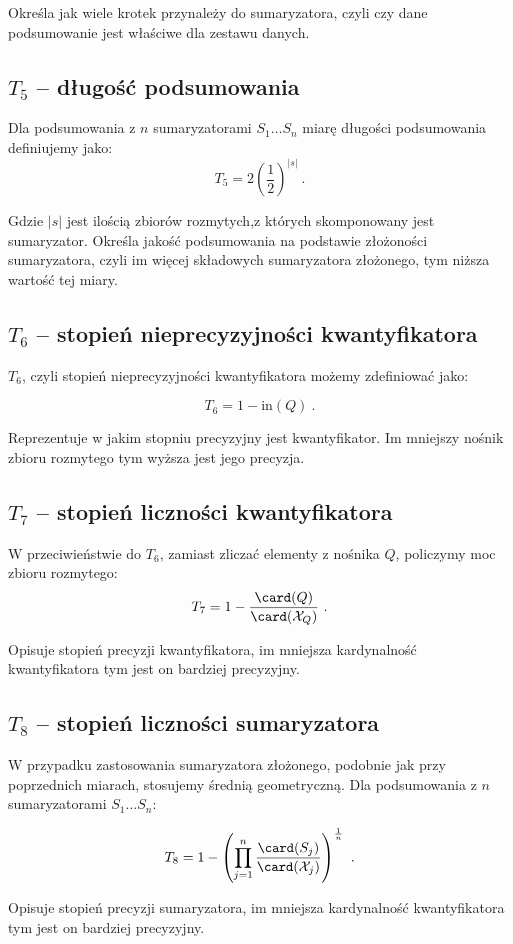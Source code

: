 \documentclass{classrep}
\begin{document}
 Określa jak wiele krotek przynależy do sumaryzatora, czyli czy dane podsumowanie jest właściwe dla zestawu danych.

\subsection{\(T_5\) -- długość podsumowania}
Dla podsumowania z \(n\) sumaryzatorami \(S_1 \ldots S_n\)
miarę długości podsumowania definiujemy jako:
\[T_5 =  2 \left(\frac{1}{2}\right)^{|s|} ~\mbox{.}\]

Gdzie \(|s|\) jest ilością zbiorów rozmytych,z  których skomponowany jest sumaryzator. Określa jakość podsumowania na podstawie złożoności sumaryzatora, czyli im więcej składowych sumaryzatora złożonego, tym niższa wartość tej miary.

\subsection{\(T_6\) -- stopień nieprecyzyjności kwantyfikatora}
\(T_6\), czyli stopień nieprecyzyjności kwantyfikatora możemy zdefiniować jako:

\[T_6 = 1-\mathrm{in}(Q) ~\mbox{.}\]

Reprezentuje w jakim stopniu precyzyjny jest kwantyfikator. Im mniejszy nośnik zbioru rozmytego tym wyższa jest jego precyzja.

\subsection{\(T_7\) -- stopień liczności kwantyfikatora}
W przeciwieństwie do \(T_6\), zamiast zliczać elementy z nośnika \(Q\),
policzymy moc zbioru rozmytego:
\[T_7 = 1-\frac{\card(Q)}{\card(\mathcal{X}_Q)} ~\mbox{.}\]

Opisuje stopień precyzji kwantyfikatora, im mniejsza kardynalność kwantyfikatora tym jest on bardziej precyzyjny.

\subsection{\(T_8\) -- stopień liczności sumaryzatora}
W przypadku zastosowania sumaryzatora złożonego, podobnie jak przy poprzednich miarach, stosujemy średnią geometryczną.
Dla podsumowania z \(n\) sumaryzatorami \(S_1 \ldots S_n\):

\[T_8 = 1- \left(\prod_{j=1}^{n} \frac{\card(S_j)}{\card(\mathcal{X}_j)}\right)^{\frac{1}{n}} ~\mbox{.}\]

Opisuje stopień precyzji sumaryzatora, im mniejsza kardynalność kwantyfikatora tym jest on bardziej precyzyjny.
\end{document}
